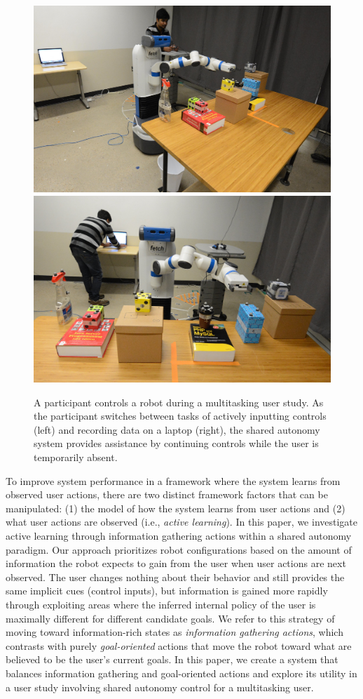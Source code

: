 \documentclass[conference]{IEEEtran}
\begin{document}
\begin{figure}
\includegraphics[width=0.49\columnwidth]{figures/task_setup-v3.jpg}
\includegraphics[width=0.49\columnwidth]{figures/teaser-v2.jpg}
\caption{A participant controls a robot during a multitasking user study. As the participant switches between tasks of actively inputting controls (left) and recording data on a laptop (right), the shared autonomy system provides assistance by continuing controls while the user is temporarily absent.}
\label{teaser}
\end{figure}

To improve system performance in a framework where the system learns from observed user actions, there are two distinct framework factors that can be manipulated: (1) the model of how the system learns from user actions and (2) what user actions are observed (i.e., \textit{active learning}). In this paper, we investigate active learning through information gathering actions within a shared autonomy paradigm. Our approach prioritizes robot configurations based on the amount of information the robot expects to gain from the user when user actions are next observed. The user changes nothing about their behavior and still provides the same implicit cues (control inputs), but information is gained more rapidly through exploiting areas where the inferred internal policy of the user is maximally different for different candidate goals. We refer to this strategy of moving toward information-rich states as \textit{information gathering actions}, which contrasts with purely \textit{goal-oriented} actions that move the robot toward what are believed to be the user's current goals. In this paper, we create a system that balances information gathering and goal-oriented actions and explore its utility in a user study involving shared autonomy control for a multitasking user.
\end{document}
